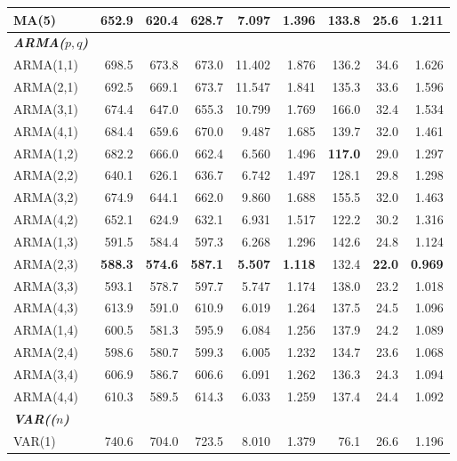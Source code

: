 \documentclass{Configuration_Files/PoliMi3i_thesis}
\begin{document}
\begin{table}[H]
\begin{tabular}{@{}lrrrrrrrr@{}}
    MA(5)  & 652.9 & 620.4 & 628.7 & 7.097  & 1.396 & 133.8 & 25.6 & 1.211 \\
    \midrule
\textbf{\textit{ARMA($p,q$)}} \\
    ARMA(1,1) & 698.5 & 673.8 & 673.0 & 11.402 & 1.876 & 136.2 & 34.6 & 1.626 \\
    ARMA(2,1) & 692.5 & 669.1 & 673.7 & 11.547 & 1.841 & 135.3 & 33.6 & 1.596 \\
    ARMA(3,1) & 674.4 & 647.0 & 655.3 & 10.799 & 1.769 & 166.0 & 32.4 & 1.534 \\
    ARMA(4,1) & 684.4 & 659.6 & 670.0 & 9.487  & 1.685 & 139.7 & 32.0 & 1.461 \\
    ARMA(1,2) & 682.2 & 666.0 & 662.4 & 6.560  & 1.496 & \textbf{117.0} & 29.0 & 1.297 \\
    ARMA(2,2) & 640.1 & 626.1 & 636.7 & 6.742  & 1.497 & 128.1 & 29.8 & 1.298 \\
    ARMA(3,2) & 674.9 & 644.1 & 662.0 & 9.860  & 1.688 & 155.5 & 32.0 & 1.463 \\
    ARMA(4,2) & 652.1 & 624.9 & 632.1 & 6.931  & 1.517 & 122.2 & 30.2 & 1.316 \\
    ARMA(1,3) & 591.5 & 584.4 & 597.3 & 6.268  & 1.296 & 142.6 & 24.8 & 1.124 \\
  \rowcolor{gray!20}
    ARMA(2,3) & \textbf{588.3} & \textbf{574.6} & \textbf{587.1} & \textbf{5.507}  & \textbf{1.118} & 132.4 & \textbf{22.0} & \textbf{0.969} \\
    ARMA(3,3) & 593.1 & 578.7 & 597.7 & 5.747  & 1.174 & 138.0 & 23.2 & 1.018 \\
    ARMA(4,3) & 613.9 & 591.0 & 610.9 & 6.019  & 1.264 & 137.5 & 24.5 & 1.096 \\
    ARMA(1,4) & 600.5 & 581.3 & 595.9 & 6.084  & 1.256 & 137.9 & 24.2 & 1.089 \\
    ARMA(2,4) & 598.6 & 580.7 & 599.3 & 6.005  & 1.232 & 134.7 & 23.6 & 1.068 \\
    ARMA(3,4) & 606.9 & 586.7 & 606.6 & 6.091  & 1.262 & 136.3 & 24.3 & 1.094 \\
    ARMA(4,4) & 610.3 & 589.5 & 614.3 & 6.033  & 1.259 & 137.4 & 24.4 & 1.092 \\
    \midrule
    \midrule
\textbf{\textit{VAR(($n$)}}\\
    VAR(1)
      & 740.6 & 704.0 & 723.5 & 8.010 & 1.379 & 76.1 & 26.6 & 1.196 \\
    \bottomrule
  \end{tabular}
\end{table}
\label{GDP_TABLE}
\end{document}
